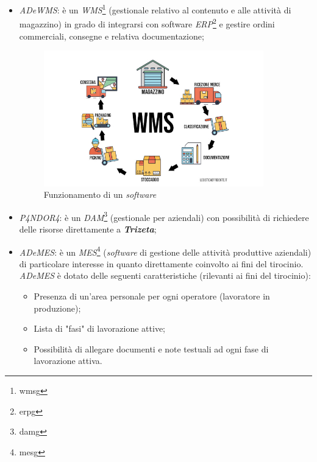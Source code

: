 \begin{itemize}
    \item \textit{ADeWMS}: è un \textit{WMS}\footnote{\gls{wmsg}} (gestionale relativo al contenuto e alle attività di magazzino) in grado di integrarsi con software \textit{ERP}\footnote{\gls{erpg}} e gestire ordini commerciali, consegne e relativa documentazione;
    \begin{figure}[H]
        \centering
        \includegraphics[width=0.9\textwidth]{images/wms.jpg}
        \caption[Caption for LOF]{Funzionamento di un \textit{software } \footnotemark}
    \end{figure}
    {}
    \item \textit{P4NDOR4}: è un \textit{DAM}\footnote{\gls{damg}} (gestionale per  aziendali) con possibilità di richiedere delle risorse direttamente a \textit{\textbf{Trizeta}};
    \item \textit{ADeMES}: è un \textit{MES}\footnote{\gls{mesg}} (\textit{software} di gestione delle attività produttive aziendali) di particolare interesse in quanto direttamente coinvolto ai fini del tirocinio. \\
    \textit{ADeMES} è dotato delle seguenti caratteristiche (rilevanti ai fini del tirocinio):
    \begin{itemize}
        \item Presenza di un'area personale per ogni operatore (lavoratore in produzione);
        \item Lista di "fasi" di lavorazione attive;
        \item Possibilità di allegare documenti e note testuali ad ogni fase di lavorazione attiva.
    \end{itemize}
\end{itemize}

